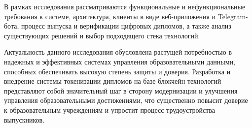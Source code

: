В рамках исследования рассматриваются функциональные и нефункциональные требования к системе, архитектура, клиенты в виде веб-приложения и Telegram-бота, процесс выпуска и верификации цифровых дипломов, а также анализ существующих решений и выбор подходящего стека технологий.

Актуальность данного исследования обусловлена растущей потребностью в надежных и эффективных системах управления образовательными данными, способных обеспечивать высокую степень защиты и доверия. Разработка и внедрение системы токенизации дипломов на базе блокчейн-технологий представляют собой значительный шаг в сторону модернизации и улучшения управления образовательными достижениями, что существенно повысит доверие к образовательным учреждениям и упростит процесс трудоустройства выпускников.